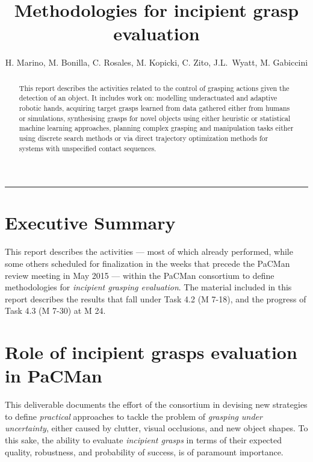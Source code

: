 \documentclass[a4paper,11pt,pdf]{pacmanreport}
\title{Methodologies for incipient grasp evaluation}
\author{H. Marino, M. Bonilla, C. Rosales, M. Kopicki, C. Zito, J.L.~Wyatt, M. Gabiccini}
\begin{document}
\maketitle

\begin{abstract}
\noindent This report describes the activities related to the control of grasping actions given the detection of an object. It includes work on: modelling underactuated and adaptive robotic hands, acquiring target grasps learned from data gathered either from humans or simulations, synthesising grasps for novel objects using either heuristic or statistical machine learning approaches, planning complex grasping and manipulation tasks either using discrete search methods or via direct trajectory optimization methods for systems with unspecified contact sequences.
\end{abstract}


\vspace{.2em}
\hrule

\footnotesize

\tableofcontents

\normalsize

\newpage

\section*{Executive Summary}

This report describes the activities --- most of which already performed, while some others scheduled for finalization in the weeks that precede the PaCMan review meeting in May 2015 --- within the PaCMan consortium to define methodologies for \emph{incipient grasping evaluation}. The material included in this report describes the results that fall under Task 4.2 (M 7-18), and the progress of Task 4.3 (M 7-30) at M 24.

\section*{Role of incipient grasps evaluation in PaCMan}

This deliverable documents the effort of the consortium in devising new strategies to define \emph{practical} approaches to tackle the problem of \emph{grasping under uncertainty}, either caused by clutter, visual occlusions, and new object shapes. To this sake, the ability to evaluate \emph{incipient grasps} in terms of their expected quality, robustness, and probability of success, is of paramount importance.
\end{document}
